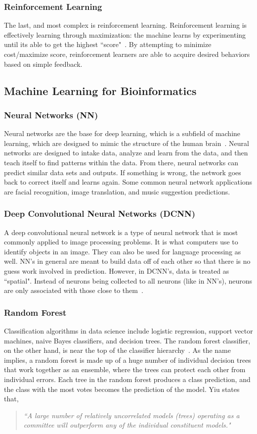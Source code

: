 \documentclass[12pt,letterpaper,oneside,reqno]{book}
\theoremstyle{plain}
\theoremstyle{definition}
\theoremstyle{plain}
\theoremstyle{remark}
\theoremstyle{plain}
\theoremstyle{definition}
\theoremstyle{plain}
\begin{document}
\subsubsection{Reinforcement Learning}
The last, and most complex is reinforcement learning. Reinforcement learning is effectively learning through maximization: the machine learns by experimenting until its able to get the highest ``score"~\cite{ExpertAI20}. By attempting to minimize cost/maximize score, reinforcement learners are able to acquire desired behaviors based on simple feedback. 

\subsection{Machine Learning for Bioinformatics}
\subsubsection{Neural Networks (NN)}
Neural networks are the base for deep learning, which is a subfield of machine learning, which are designed to mimic the structure of the human brain~\cite{IBM20}.  Neural networks are designed to intake data, analyze and learn from the data, and then teach itself to find patterns within the data. From there, neural networks can predict similar data sets and outputs. If something is wrong, the network goes back to correct itself and learns again. Some common neural network applications are facial recognition, image translation, and music suggestion predictions.
\subsubsection{Deep Convolutional Neural Networks (DCNN)}
 A deep convolutional neural network is a type of neural network that is most commonly applied to image processing problems. It is what computers use to identify objects in an image. They can also be used for language processing as well. NN's in general are meant to build data off of each other so that there is no guess work involved in prediction. However, in DCNN's, data is treated as ``spatial". Instead of neurons being collected to all neurons (like in NN's), neurons are only associated with those close to them~\cite{Saha18}.
\subsubsection{Random Forest} %
Classification algorithms in data science include logistic regression, support vector machines, naive Bayes classifiers, and decision trees. The random forest classifier, on the other hand, is near the top of the classifier hierarchy~\cite{Yiu19}. As the name implies, a random forest is made up of a huge number of individual decision trees that work together as an ensemble, where the trees can protect each other from individual errors. Each tree in the random forest produces a class prediction, and the class with the most votes becomes the prediction of the model. Yiu states that, 
\begin{quote}
    \itshape``A large number of relatively uncorrelated models (trees) operating as a committee will outperform any of the individual constituent models."
\end{quote}
\end{document}
